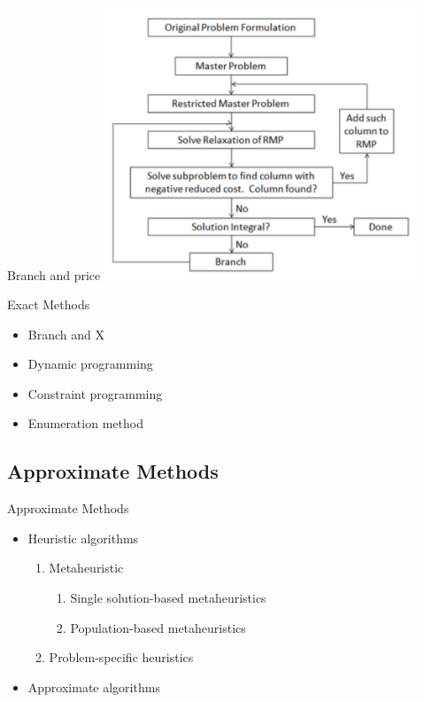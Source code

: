    \begin{frame}{Branch and price}
      \centering
      \includegraphics[width = 0.7\textwidth]{images/branch_price.png}
    \end{frame}

    \begin{frame}{Exact Methods}
      \begin{itemize}
        \item Branch and X
        \item<+-> Dynamic programming
        \item<+-> Constraint programming
        \item<+-> Enumeration method
      \end{itemize}
    \end{frame}



    \subsection{Approximate Methods}
    \frame{\sectionpage}

    \begin{frame}{Approximate Methods}
      \begin{itemize}
        \item Heuristic algorithms
        \vspace{4pt}
        \begin{enumerate}
          \item<+->  Metaheuristic
            \begin{enumerate}
              \item<+>[*] Single solution-based metaheuristics
              \item<+>[*] Population-based metaheuristics
            \end{enumerate}
          \vspace{4pt}
          \item<+->  Problem-specific heuristics
        \end{enumerate}
        \vspace{10pt}
        \item<+-> Approximate algorithms
      \end{itemize}
    \end{frame}

